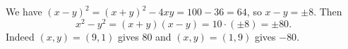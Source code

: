 We have $(x-y)^2=(x+y)^2-4xy=100-36=64$, so $x-y=\pm8$. Then
\[
x^2-y^2=(x+y)(x-y)=10\cdot(\pm8)=\boxed{\pm80}.
\]
Indeed $(x,y)=(9,1)$ gives $80$ and $(x,y)=(1,9)$ gives $-80$.
